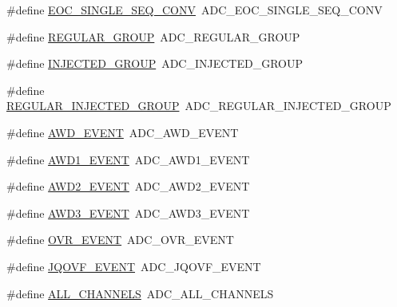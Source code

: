 \begin{DoxyCompactItemize}
\item 
\#define \hyperlink{group___h_a_l___a_d_c___aliased___defines_ga503236c97697e9135a9d1c2c88cac7c9}{E\+O\+C\+\_\+\+S\+I\+N\+G\+L\+E\+\_\+\+S\+E\+Q\+\_\+\+C\+O\+NV}~A\+D\+C\+\_\+\+E\+O\+C\+\_\+\+S\+I\+N\+G\+L\+E\+\_\+\+S\+E\+Q\+\_\+\+C\+O\+NV
\item 
\#define \hyperlink{group___h_a_l___a_d_c___aliased___defines_ga37bac62f24a8600f62d0d35683a0a4de}{R\+E\+G\+U\+L\+A\+R\+\_\+\+G\+R\+O\+UP}~A\+D\+C\+\_\+\+R\+E\+G\+U\+L\+A\+R\+\_\+\+G\+R\+O\+UP
\item 
\#define \hyperlink{group___h_a_l___a_d_c___aliased___defines_gaa5d1cfe7b35cb724d898622cbd6b7894}{I\+N\+J\+E\+C\+T\+E\+D\+\_\+\+G\+R\+O\+UP}~A\+D\+C\+\_\+\+I\+N\+J\+E\+C\+T\+E\+D\+\_\+\+G\+R\+O\+UP
\item 
\#define \hyperlink{group___h_a_l___a_d_c___aliased___defines_ga1e691aaec563e444d3965d5d98d1c47b}{R\+E\+G\+U\+L\+A\+R\+\_\+\+I\+N\+J\+E\+C\+T\+E\+D\+\_\+\+G\+R\+O\+UP}~A\+D\+C\+\_\+\+R\+E\+G\+U\+L\+A\+R\+\_\+\+I\+N\+J\+E\+C\+T\+E\+D\+\_\+\+G\+R\+O\+UP
\item 
\#define \hyperlink{group___h_a_l___a_d_c___aliased___defines_ga21fdc6d3f5ae5c030acc0f5518fbea4a}{A\+W\+D\+\_\+\+E\+V\+E\+NT}~A\+D\+C\+\_\+\+A\+W\+D\+\_\+\+E\+V\+E\+NT
\item 
\#define \hyperlink{group___h_a_l___a_d_c___aliased___defines_ga1429af679941d537c64f7004430fdf54}{A\+W\+D1\+\_\+\+E\+V\+E\+NT}~A\+D\+C\+\_\+\+A\+W\+D1\+\_\+\+E\+V\+E\+NT
\item 
\#define \hyperlink{group___h_a_l___a_d_c___aliased___defines_ga04d97e3fb4776a8fae622cf88b442687}{A\+W\+D2\+\_\+\+E\+V\+E\+NT}~A\+D\+C\+\_\+\+A\+W\+D2\+\_\+\+E\+V\+E\+NT
\item 
\#define \hyperlink{group___h_a_l___a_d_c___aliased___defines_gabb3f690eef894c37c3f2c49e1d8c6c06}{A\+W\+D3\+\_\+\+E\+V\+E\+NT}~A\+D\+C\+\_\+\+A\+W\+D3\+\_\+\+E\+V\+E\+NT
\item 
\#define \hyperlink{group___h_a_l___a_d_c___aliased___defines_gaf63a166dce844ba44197109fe3a3d02f}{O\+V\+R\+\_\+\+E\+V\+E\+NT}~A\+D\+C\+\_\+\+O\+V\+R\+\_\+\+E\+V\+E\+NT
\item 
\#define \hyperlink{group___h_a_l___a_d_c___aliased___defines_gae63ff704e73ca97890da8a07e141bb96}{J\+Q\+O\+V\+F\+\_\+\+E\+V\+E\+NT}~A\+D\+C\+\_\+\+J\+Q\+O\+V\+F\+\_\+\+E\+V\+E\+NT
\item 
\#define \hyperlink{group___h_a_l___a_d_c___aliased___defines_gac9dcdba2096f6b3adab742b8b1a256c2}{A\+L\+L\+\_\+\+C\+H\+A\+N\+N\+E\+LS}~A\+D\+C\+\_\+\+A\+L\+L\+\_\+\+C\+H\+A\+N\+N\+E\+LS

\end{DoxyCompactItemize}
